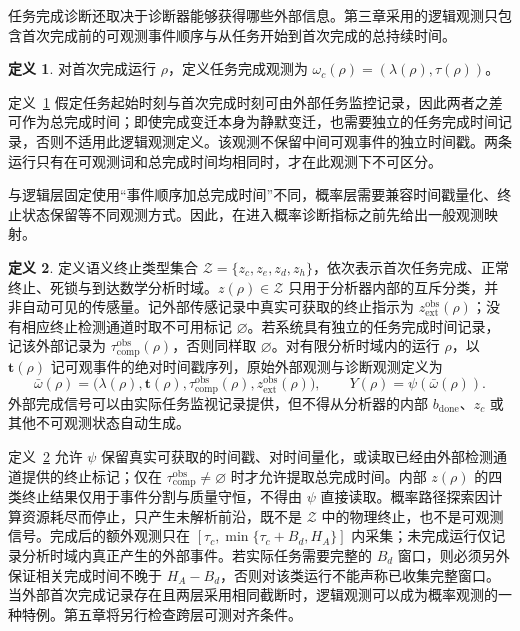 \documentclass[master,fontset=ubuntu]{shnuthesis}
\theoremstyle{definition}
\newtheorem{thesisdefinition}{定义}
\begin{document}
任务完成诊断还取决于诊断器能够获得哪些外部信息。第三章采用的逻辑观测只包含首次完成前的可观测事件顺序与从任务开始到首次完成的总持续时间。

\begin{thesisdefinition}
\label{def:logical-observation}
对首次完成运行 \(\rho\)，定义任务完成观测为
\(\omega_c(\rho)=(\lambda(\rho),\tau(\rho))\)。
\end{thesisdefinition}

定义~\ref{def:logical-observation} 假定任务起始时刻与首次完成时刻可由外部任务监控记录，因此两者之差可作为总完成时间；即使完成变迁本身为静默变迁，也需要独立的任务完成时间记录，否则不适用此逻辑观测定义。该观测不保留中间可观事件的独立时间戳。两条运行只有在可观测词和总完成时间均相同时，才在此观测下不可区分。

与逻辑层固定使用“事件顺序加总完成时间”不同，概率层需要兼容时间戳量化、终止状态保留等不同观测方式。因此，在进入概率诊断指标之前先给出一般观测映射。

\begin{thesisdefinition}
\label{def:probability-observation}
定义语义终止类型集合 $\mathcal Z=\{z_c,z_e,z_d,z_h\}$，依次表示首次任务完成、正常终止、死锁与到达数学分析时域。$z(\rho)\in\mathcal Z$ 只用于分析器内部的互斥分类，并非自动可见的传感量。记外部传感记录中真实可获取的终止指示为 $z_{\mathrm{ext}}^{\mathrm{obs}}(\rho)$；没有相应终止检测通道时取不可用标记 $\varnothing$。若系统具有独立的任务完成时间记录，记该外部记录为 $\tau_{\mathrm{comp}}^{\mathrm{obs}}(\rho)$，否则同样取 $\varnothing$。对有限分析时域内的运行 $\rho$，以 $\mathbf t(\rho)$ 记可观事件的绝对时间戳序列，原始外部观测与诊断观测定义为
\begin{equation}
\bar\omega(\rho)
=\bigl(\lambda(\rho),\mathbf t(\rho),\tau_{\mathrm{comp}}^{\mathrm{obs}}(\rho),z_{\mathrm{ext}}^{\mathrm{obs}}(\rho)\bigr),
\qquad
Y(\rho)=\psi\!\left(\bar\omega(\rho)\right).
\label{eq:probability-observation}
\end{equation}
外部完成信号可以由实际任务监视记录提供，但不得从分析器的内部 $b_{\mathrm{done}}$、$z_c$ 或其他不可观测状态自动生成。
\end{thesisdefinition}

定义~\ref{def:probability-observation} 允许 $\psi$ 保留真实可获取的时间戳、对时间量化，或读取已经由外部检测通道提供的终止标记；仅在 $\tau_{\mathrm{comp}}^{\mathrm{obs}}\neq\varnothing$ 时才允许提取总完成时间。内部 $z(\rho)$ 的四类终止结果仅用于事件分割与质量守恒，不得由 $\psi$ 直接读取。概率路径探索因计算资源耗尽而停止，只产生未解析前沿，既不是 $\mathcal Z$ 中的物理终止，也不是可观测信号。完成后的额外观测只在 $[\tau_c,\min\{\tau_c+B_d,H_A\}]$ 内采集；未完成运行仅记录分析时域内真正产生的外部事件。若实际任务需要完整的 $B_d$ 窗口，则必须另外保证相关完成时间不晚于 $H_A-B_d$，否则对该类运行不能声称已收集完整窗口。当外部首次完成记录存在且两层采用相同截断时，逻辑观测可以成为概率观测的一种特例。第五章将另行检查跨层可测对齐条件。
\end{document}
